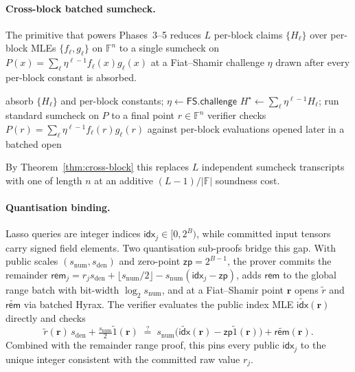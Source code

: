 \documentclass[letterpaper,twocolumn,10pt]{article}
\theoremstyle{remark}
\theoremstyle{definition}
\newcommand{\FF}{\mathbb{F}}
\begin{document}
\paragraph{Cross-block batched sumcheck.}
\label{ssec:cross-block}
The primitive that powers Phases~3--5 reduces $L$ per-block claims
$\{H_\ell\}$ over per-block MLEs $\{f_\ell,g_\ell\}$ on $\FF^n$ to a
single sumcheck on
$P(x)\!=\!\sum_\ell\eta^{\ell-1}f_\ell(x)g_\ell(x)$ at a Fiat--Shamir
challenge $\eta$ drawn after every per-block constant is absorbed.

\begin{algorithm}[H]
\caption{$\textsc{CrossBatch}(\{f_\ell,g_\ell,H_\ell\}_\ell,\mathsf{FS})$}
\label{alg:cross-block}
\begin{algorithmic}[1]
\State absorb $\{H_\ell\}$ and per-block constants;\;
       $\eta\!\gets\!\mathsf{FS}.\mathsf{challenge}$
\State $H^\star\!\gets\!\sum_\ell\eta^{\ell-1}H_\ell$;\;
       run standard sumcheck on $P$ to a final point $r\!\in\!\FF^n$
\State verifier checks
       $P(r)\!=\!\sum_\ell\eta^{\ell-1}f_\ell(r)g_\ell(r)$ against
       per-block evaluations opened later in a batched open
\end{algorithmic}
\end{algorithm}

By Theorem~\ref{thm:cross-block} this replaces $L$ independent
sumcheck transcripts with one of length $n$ at an additive
$(L\!-\!1)/|\FF|$ soundness cost.

\paragraph{Quantisation binding.}
\label{ssec:quant}
Lasso queries are integer indices $\mathsf{idx}_j\!\in\![0,2^B)$, while
committed input tensors carry signed field elements. Two quantisation
sub-proofs bridge this gap. With public scales
$(s_{\mathrm{num}},s_{\mathrm{den}})$ and zero-point
$\mathsf{zp}\!=\!2^{B-1}$, the prover commits the remainder
$\mathsf{rem}_j\!=\!r_j s_{\mathrm{den}}+\lfloor s_{\mathrm{num}}/2\rfloor-s_{\mathrm{num}}(\mathsf{idx}_j-\mathsf{zp})$,
adds $\mathsf{rem}$ to the global range batch with bit-width
$\log_2 s_{\mathrm{num}}$, and at a Fiat--Shamir point $\mathbf r$
opens $\widetilde r$ and $\widetilde{\mathsf{rem}}$ via batched Hyrax.
The verifier evaluates the public index MLE
$\widetilde{\mathsf{idx}}(\mathbf r)$ directly and checks
\begin{equation}
  \widetilde r(\mathbf r)\,s_{\mathrm{den}}
  + \tfrac{s_{\mathrm{num}}}{2}\widetilde 1(\mathbf r)
  \;\stackrel{?}{=}\;
  s_{\mathrm{num}}\bigl(\widetilde{\mathsf{idx}}(\mathbf r)-\mathsf{zp}\widetilde 1(\mathbf r)\bigr)
  + \widetilde{\mathsf{rem}}(\mathbf r).
  \label{eq:quant}
\end{equation}
Combined with the remainder range proof, this pins every public
$\mathsf{idx}_j$ to the unique integer consistent with the committed
raw value $r_j$.
\end{document}
